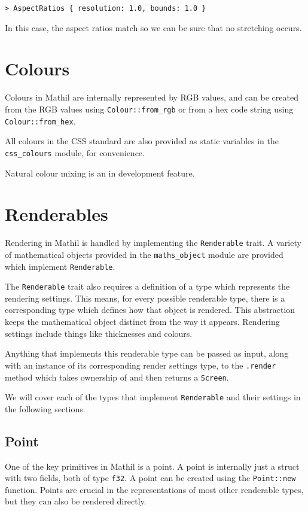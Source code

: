 \begin{lstlisting}
> AspectRatios { resolution: 1.0, bounds: 1.0 }
\end{lstlisting}

In this case, the aspect ratios match so we can be sure that no stretching occurs.

\section{Colours}

Colours in Mathil are internally represented by RGB values, and can be created from the RGB values using \verb|Colour::from_rgb| or from a hex code string using \verb|Colour::from_hex|.

All colours in the CSS standard are also provided as static variables in the \verb|css_colours| module, for convenience.

Natural colour mixing is an in development feature.

\section{Renderables}

Rendering in Mathil is handled by implementing the \verb|Renderable| trait. A variety of mathematical objects provided in the \verb|maths_object| module are provided which implement \verb|Renderable|.

The \verb|Renderable| trait also requires a definition of a type which represents the rendering settings. This means, for every possible renderable type, there is a corresponding type which defines how that object is rendered. This abstraction keeps the mathematical object distinct from the way it appears. Rendering settings include things like thicknesses and colours.

Anything that implements this renderable type can be passed as input, along with an instance of its corresponding render settings type, to the \verb|.render| method which takes ownership of and then returns a \verb|Screen|.

We will cover each of the types that implement \verb|Renderable| and their settings in the following sections.

\subsection{Point}

One of the key primitives in Mathil is a point. A point is internally just a struct with two fields, both of type \verb|f32|. A point can be created using the \verb|Point::new| function. Points are crucial in the representations of most other renderable types, but they can also be rendered directly.

